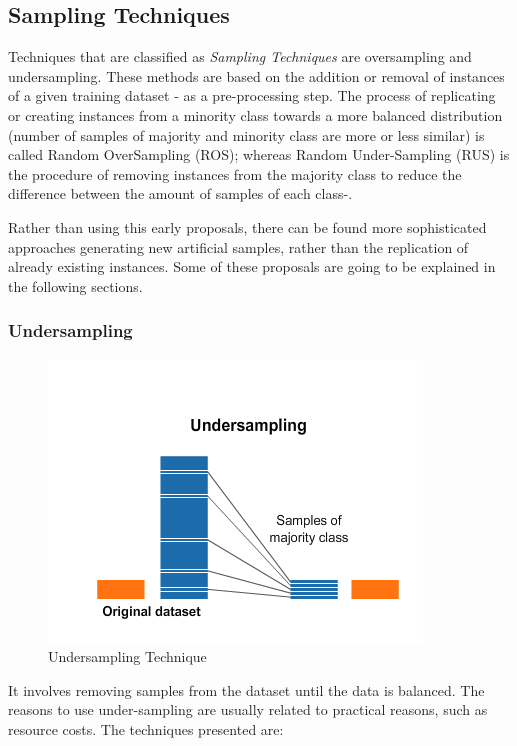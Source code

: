\subsection{Sampling Techniques}
\label{subsec:samlpingTech}

Techniques that are classified as \textit{Sampling Techniques} are oversampling 
and undersampling. These methods are based on the addition or removal of 
instances of a given training dataset - as a pre-processing step. The process 
of replicating or creating instances from a minority class towards a more 
balanced distribution (number of samples of majority and minority class are
more or less similar) is called Random OverSampling (ROS); whereas Random 
Under-Sampling (RUS) is the procedure of removing instances from the majority 
class to reduce the difference between the amount of samples of each class-.

Rather than using this early proposals, there can be found more sophisticated 
approaches generating new artificial samples, rather than the replication of 
already existing instances. Some of these proposals are going to be explained 
in the following sections. 

\subsubsection{Undersampling}

\begin{figure}[h!]
\centering
\includegraphics[width=.7\textwidth]{figures/Undersampling.png}
\caption{Undersampling Technique \cite{OverUnderIbm2019}}
\label{fig:undersampling}
\end{figure}

It involves removing samples from the dataset until the data
is balanced. The reasons to use under-sampling are usually related to practical 
reasons, such as resource costs. The techniques presented are:

